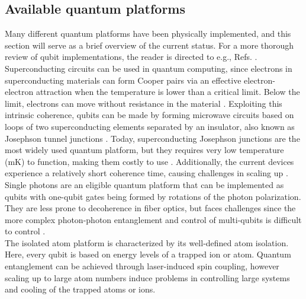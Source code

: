 \subsection{Available quantum platforms}


Many different quantum platforms have been physically implemented, and this section will serve as a brief overview of the current status. For a more thorough review of qubit implementations, the reader is directed to e.g., Refs. \cite{Ladd2010, Acin2018}. \\

Superconducting circuits can be used in quantum computing, since electrons in superconducting materials can form Cooper pairs via an effective electron-electron attraction when the temperature is lower than a critical limit. Below the limit, electrons can move without resistance in the material \cite{KristianFossheim2004}. Exploiting this intrinsic coherence, qubits can be made by forming microwave circuits based on loops of two superconducting elements separated by an insulator, also known as Josephson tunnel junctions \cite{Acin2018, Nakamura1999}. Today, superconducting Josephson junctions are the most widely used quantum platform, but they requires very low temperature (mK) to function, making them costly to use \cite{Acin2018}. Additionally, the current devices experience a relatively short coherence time, causing challenges in scaling up \cite{Acin2018}. \\

Single photons are an eligible quantum platform that can be implemented as qubits with one-qubit gates being formed by rotations of the photon polarization. They are less prone to decoherence in fiber optics, but faces challenges since the more complex photon-photon entanglement and control of multi-qubits is difficult to control \cite{Ladd2010}. \\


The isolated atom platform is characterized by its well-defined atom isolation. Here, every qubit is based on energy levels of a trapped ion or atom. Quantum entanglement can be achieved through laser-induced spin coupling, however scaling up to large atom numbers induce problems in controlling large systems and cooling of the trapped atoms or ions. \\

